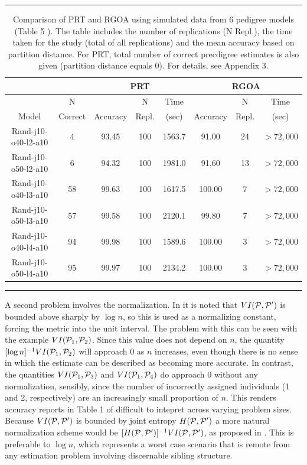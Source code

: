 \documentclass[twoside,10pt,twocolumn]{article}
\newcommand{\calp}{{\cal P}}
\begin{document}
\begin{table}
\caption{Comparison of PRT and RGOA  using simulated data from 6 pedigree models (Table 5 \citep{Chou2012}). 
The table includes the number of replications (N Repl.), the time taken for the study (total of all 
replications) and the mean accuracy based on partition distance. For PRT, total number of correct precdigree 
estimates is also given (partition distance equals 0). For details, see Appendix 3.}\label{rgoa.table}
\rule{\textwidth}{0.90pt}
\begin{center}
\begin{tabular}{c|cccc|ccc}
\multicolumn{2}{c}{}&\multicolumn{3}{c}{PRT}&\multicolumn{3}{c}{RGOA} \\ \hline	
	&N 	&	&N	&Time	&&N &Time \\ 
Model	&Correct&Accuracy	&Repl.	&(sec)	&Accuracy	&Repl.&(sec) \\ \hline
Rand-j10-o40-l2-a10	&4	&93.45	&100	&1563.7	&91.00	&24	&$> 72,000$ \\
Rand-j10-o50-l2-a10	&6	&94.32	&100	&1981.0	&91.60	&13	&$> 72,000$ \\
Rand-j10-o40-l3-a10	&58	&99.63	&100	&1617.5	&100.00	&7	&$> 72,000$ \\
Rand-j10-o50-l3-a10	&57	&99.58	&100	&2120.1	&99.80	&7	&$> 72,000$ \\
Rand-j10-o40-l4-a10	&94	&99.98	&100	&1589.6	&100.00	&3	&$> 72,000$ \\
Rand-j10-o50-l4-a10	&95	&99.97	&100	&2134.2	&100.00	&3	&$> 72,000$
\end{tabular}
\end{center}
\rule{\textwidth}{0.90pt}
\end{table}


A second problem involves the normalization. In \citet{BrownDexter2012} it is noted that $VI(\calp, \calp^
\prime)$ is bounded above sharply by $\log n$, so this is used as a normalizing constant, forcing the metric 
into the unit interval. The problem with this can be seen with the example  $VI(\calp_1, \calp_2)$. Since 
this value does not depend on $n$, the quantity $[\log n]^{-1} VI(\calp_1, \calp_2)$ will approach 0 as $n$ 
increases, even though there is no sense in which the estimate can be described as becoming more accurate. 
In contrast, the quantities $VI(\calp_1, \calp_3)$ and  $VI(\calp_1, \calp_4)$ do approach 0 without any 
normalization, sensibly, since the number of incorrectly assigned individuals (1 and 2, respectively) are an 
increasingly small proportion of $n$. This renders accuracy reports in Table 1 of \citet{BrownDexter2012} 
difficult to intepret across varying problem sizes. Because $VI(\calp, \calp^\prime)$ is bounded by joint 
entropy $H(\calp, \calp^\prime)$ a more natural normalization scheme would be $[H(\calp, \calp^\prime)]^{-1} 
VI(\calp, \calp^\prime)$, as proposed in \citet{kraskovEtAl2005}. This is preferable to $\log n$, which 
represents a worst case scenario that is remote from any estimation problem involving discernable sibling 
structure. 
\end{document}
